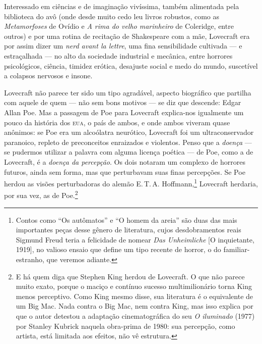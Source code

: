 Interessado em ciências e de imaginação vivíssima, também alimentada
pela biblioteca do avô (onde desde muito cedo leu livros robustos, como
as \emph{Metamorfoses} de Ovídio e \emph{A rima do velho marinheiro} de
Coleridge, entre outros) e por uma rotina de recitação de Shakespeare
com a mãe, Lovecraft era por assim dizer um \emph{nerd avant la lettre},
uma fina sensibilidade cultivada --- e estraçalhada --- no alto da
sociedade industrial e mecânica, entre horrores psicológicos, ciência,
timidez erótica, desajuste social e medo do mundo, suscetível a colapsos
nervosos e insone.

Lovecraft não parece ter sido um tipo agradável, aspecto biográfico que
partilha com aquele de quem --- não sem bons motivos --- se diz que
descende: Edgar Allan Poe. Mas a passagem de Poe para
Lovecraft explica-nos igualmente um pouco da história dos \textsc{eua}, o país de
ambos, e onde ambos viveram quase anônimos: se Poe era um alcoólatra
neurótico, Lovecraft foi um ultraconservador paranoico, repleto de
preconceitos enraizados e violentos. Penso que a \emph{doença} --- se
pudermos utilizar a palavra com alguma licença poética --- de Poe, como a
de Lovecraft, é a \emph{doença da percepção}. Os dois notaram um complexo
de horrores futuros, ainda sem forma, mas que perturbavam suas finas
percepções. Se Poe herdou as visões perturbadoras do alemão E.\,T.\,A.
Hoffmann,\footnote{Contos como ``Os autômatos'' e ``O homem da areia'' são duas das mais importantes
  peças desse gênero de literatura, cujos desdobramentos reais Sigmund
  Freud teria a felicidade de nomear \emph{Das Unheimliche} [O inquietante,
  1919], no valioso ensaio que define um tipo recente de horror, o do
  familiar-estranho, que veremos adiante.} Lovecraft herdaria, por sua
vez, as de Poe.\footnote{E há quem diga que Stephen King herdou de
  Lovecraft. O que não parece muito exato, porque o maciço e contínuo
  sucesso multimilionário torna King menos perceptivo. Como King mesmo
  disse, sua literatura é o equivalente de um Big Mac. Nada contra o Big
  Mac, nem contra King, mas isso explica por que o autor detestou a
  adaptação cinematográfica do seu \emph{O iluminado} (1977) por Stanley Kubrick naquela obra-prima de 1980: sua percepção,
  como artista, está limitada aos efeitos, não vê estrutura.}

